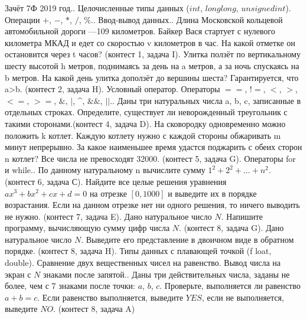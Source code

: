 \documentclass[a4paper,12pt]{article}
\begin{document}
Зачёт 7Ф 2019 год.. Целочисленные типы данных ($int$, $long long$, $unsigned int$). Операции $+$, $-$, $*$, $/$, $\%$.. Ввод-вывод данных.. Длина Московской кольцевой автомобильной дороги —109 километров. Байкер Вася стартует с нулевого километра МКАД и едет со скоростью v километров в час. На какой отметке он остановится через t часов? (контест 1, задача I). Улитка ползёт по вертикальному шесту высотой h метров, поднимаясь за день на a метров, а за ночь спускаясь на b метров. На какой день улитка доползёт до вершины шеста? Гарантируется, что a>b. (контест 2, задача H). Условный оператор. Операторы $==$, $!=$, $<$, $>$, $<=$, $>=$, $\&$, $|$, \textasciicircum, $\&\&$, $||$.. Даны три натуральных числа a, b, c, записанные в отдельных строках. Определите, существует ли неворожденный треугольник с такими сторонами.(контест 4, задача D). На сковородку одновременно можно положить k котлет. Каждую котлету нужно с каждой стороны обжаривать m минут непрерывно. За какое наименьшее время удастся поджарить с обеих сторон n котлет? Все числа не превосходят 32000. (контест 5, задача G). Операторы for и while.. По данному натуральному n вычислите сумму $1^2+2^2+\dots+n^2$. (контест 6, задача С). Найдите все целые решения уравнения $ax^3 + bx^2 + cx + d = 0$ на отрезке $[0,1000]$ и выведите их в порядке возрастания.  Если на данном отрезке нет ни одного решения, то ничего выводить не нужно. (контест 7, задача E). Дано натуральное число $N$. Напишите программу, вычисляющую сумму цифр числа $N$. (контест 8, задача G). Дано натуральное число $N$. Выведите его представление в двоичном виде в обратном порядке. (контест 8, задача H). Типы данных с плавающей точкой (f loat, double). Сравнение двух вещественных чисел на равенство. Вывод числа на экран с $N$ знаками после запятой.. Даны три действительных числа, заданы не более, чем с 7 знаками после точки: $a$, $b$, $c$. Проверьте, выполняется ли равенство $a + b = c$. Если равенство выполняется, выведите $YES$, если не выполняется, выведите $NO$. (контест 8, задача A)\newline
\end{document}
